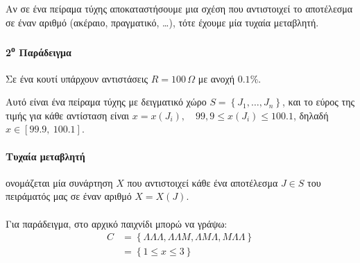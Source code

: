 \documentclass[11pt,a4paper,notitlepage,fleqn,final]{article}
\begin{document}
	Αν σε ένα πείραμα τύχης αποκαταστήσουμε μια σχέση που αντιστοιχεί
	το αποτέλεσμα σε έναν αριθμό (ακέραιο, πραγματικό, \dots), τότε
	έχουμε μία τυχαία μεταβλητή.
	
	\paragraph{2\textsuperscript{ο} Παράδειγμα}
	Σε ένα κουτί υπάρχουν αντιστάσεις \( R= 100\, \Omega \)
	με ανοχή \( 0.1\% \).
	
	Αυτό είναι ένα πείραμα τύχης με δειγματικό χώρο
	\( S = \left\lbrace J_1,\dots,J_n \right\rbrace \), και το εύρος
	της τιμής για κάθε αντίσταση είναι \( x=x(J_i), \quad
	99,9 \leq x(J_i) \leq 100.1 \), δηλαδή \( x \in [99.9,\ 100.1] \).
	
	\paragraph{Τυχαία μεταβλητή} ονομάζεται μία συνάρτηση \( X \)
	που αντιστοιχεί κάθε ένα αποτέλεσμα \( J \in S \) του πειράματός μας
	σε έναν αριθμό \( X=X(J) \).
	
	\paragraph{}
	Για παράδειγμα, στο αρχικό παιχνίδι μπορώ να γράψω:
	\begin{align*}
		C &= \left\lbrace \varLambda\varLambda\varLambda,
		\varLambda\varLambda M, \varLambda M \varLambda,
		M\varLambda\varLambda \right\rbrace
		\\ &= \left\lbrace 1 \leq x \leq 3 \right\rbrace
	\end{align*}
	
\end{document}

